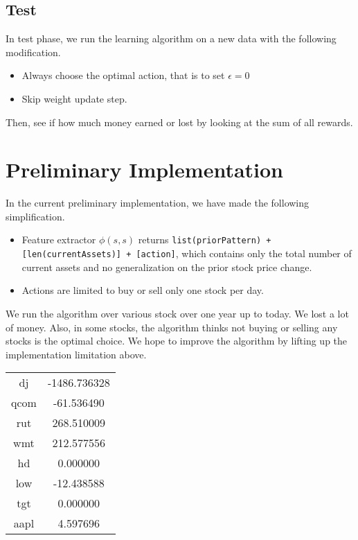 \documentclass[12pt]{article}
\begin{document}
\subsection{Test}

In test phase, we run the learning algorithm on a new data with the
following modification.

\begin{itemize}
\item Always choose the optimal action, that is to set $\epsilon = 0$
\item Skip weight update step.
\end{itemize}

Then, see if how much money earned or lost by looking at the sum of
all rewards.

\section{Preliminary Implementation}

In the current preliminary implementation, we have made the following
simplification.

\begin{itemize}
\item Feature extractor $\phi(s, s)$ returns
  \verb|list(priorPattern) + [len(currentAssets)] + [action]|, which
  contains only the total number of current assets and no
  generalization on the prior stock price change.

  \item Actions are limited to buy or sell only one stock per day.
\end{itemize}

We run the algorithm over various stock over one year up to today. We lost a lot of money. Also, in some stocks, the
algorithm thinks not buying or selling any stocks is the optimal choice. We hope to improve the algorithm by lifting up
the implementation limitation above.

\begin{tabular}{|c|c|}
  \hline 
dj & -1486.736328 \\ 
qcom & -61.536490 \\ 
rut & 268.510009 \\ 
wmt & 212.577556 \\ 
hd & 0.000000 \\ 
low & -12.438588 \\ 
tgt & 0.000000 \\ 
aapl & 4.597696 \\
\hline
\end{tabular}
\end{document}
